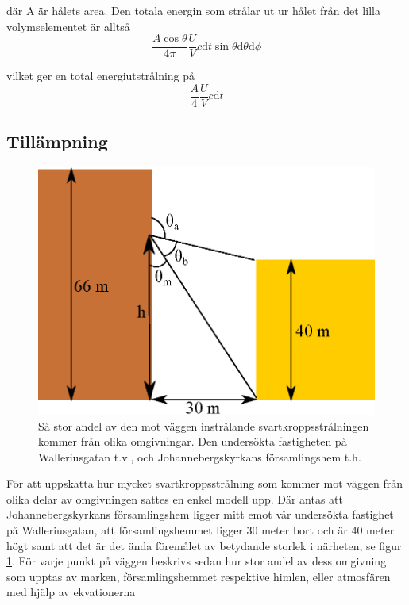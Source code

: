 där A är hålets area. Den totala energin som strålar ut ur hålet från det lilla 
volymselementet är alltså 
\begin{equation}
\frac{A\cos\theta}{4\pi}\frac{U}{V} c\mathrm{d}t \sin\theta\mathrm{d}\theta \mathrm{d}\phi
\end{equation}

vilket ger en total energiutstrålning på
\begin{equation}
\frac{A}{4}\frac{U}{V}c \mathrm{d}t
\end{equation}

\subsection{Tillämpning}

\begin{figure}[hpbt]
\centering
\includegraphics[height=0.3\textheight]{images/blackbody_surroundings.eps}
\caption{\label{fig:surroundings}{Så stor andel av den mot väggen instrålande 
svartkroppsstrålningen kommer från olika omgivningar. Den undersökta fastigheten på 
Walleriusgatan t.v., och Johannebergskyrkans församlingshem t.h.}}
\end{figure}

För att uppskatta hur mycket svartkroppsstrålning som kommer mot väggen från olika 
delar av omgivningen sattes en enkel modell upp. Där antas att Johannebergskyrkans 
församlingshem ligger mitt emot vår undersökta fastighet på Walleriusgatan, att 
församlingshemmet ligger 30 meter bort och är 40 meter högt samt att det är det ända 
föremålet av betydande storlek i närheten, se figur \ref{fig:surroundings}. För varje punkt
 på väggen beskrivs sedan hur stor andel av dess omgivning som upptas av marken, 
 församlingshemmet respektive himlen, eller atmosfären med hjälp av ekvationerna

